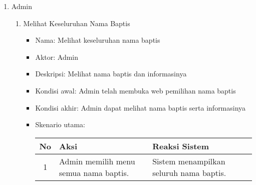 \documentclass[a4paper,twoside]{article}
\begin{document}
\begin{enumerate}
\begin{enumerate}
\begin{enumerate}
\begin{itemize}
                        
                                \end{itemize}
																\end{enumerate}
																\item Admin
																\begin{enumerate}
																\item Melihat Keseluruhan Nama Baptis
									
                         \begin{itemize}
                                        \item Nama: Melihat keseluruhan nama baptis
                                        \item Aktor: Admin
                                        \item Deskripsi: Melihat nama baptis dan informasinya
                                        \item Kondisi awal: Admin telah membuka web pemilihan nama baptis  %
                                        \item Kondisi akhir: Admin dapat melihat nama baptis serta informasinya %
                                        \item Skenario utama:														
				
				\begin{center}
			  \begin{tabular}{ | c | p{5cm} |p{5cm} |}
			    \hline
			    No  & Aksi & Reaksi Sistem\\ \hline 
				1 & Admin memilih menu semua nama baptis.%
				&  Sistem menampilkan seluruh nama baptis.\\ \hline 
			    \end{tabular}
			\end{center}
																
																       \end{itemize}
																

\end{enumerate}
\end{enumerate}
\end{enumerate}
\end{document}
